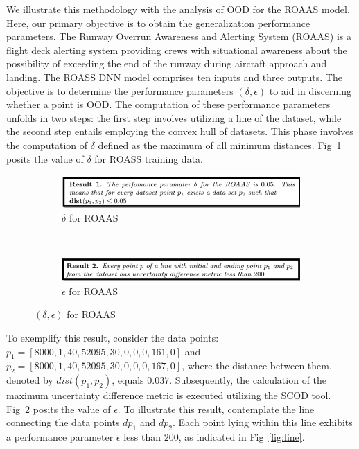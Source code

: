 We illustrate this methodology with the analysis of OOD for the ROAAS model. Here, our primary objective is to obtain the generalization performance parameters. The Runway Overrun Awareness and Alerting System (ROAAS) is a flight deck alerting system providing crews with situational awareness about the possibility of exceeding the end of the runway during aircraft approach and landing. The ROASS DNN model comprises ten inputs and three outputs. The objective is to determine the performance parameters 
$(\delta, \epsilon)$ to aid in discerning whether a point is OOD. The computation of these performance parameters unfolds in two steps: the first step involves utilizing a line of the dataset, while the second step entails employing the convex hull of datasets. This phase involves the computation of $\delta$ defined as the maximum of all minimum distances. Fig~\ref{fig:deltaR} posits the value of $\delta$ for ROASS training data. 
\begin{figure}
\begin{subfigure}{.24\textwidth}
    \includegraphics[width=2.0\linewidth]{Fig/OOD_result1.png}  
    \caption{$\delta$ for ROAAS}
    \label{fig:deltaR}
\end{subfigure}
\\
\begin{subfigure}{.24\textwidth}
    \includegraphics[width=2.0\linewidth]{Fig/OOD_result2.png}  
    \caption{$\epsilon$ for ROAAS}
    \label{fig:epsilonR}
 \end{subfigure}
\caption{$(\delta,\epsilon)$ for ROAAS}
\label{FIGURE LABEL}
\end{figure}
To exemplify this result, consider the data points: $p_1= [8000, 1, 40, 52095, 30, 0,0,0, 161, 0]$ and $p_2= [8000, 1, 40, 52095, 30, 0, 0, 0, 167, 0]$, where the distance between them, denoted by $dist(p_1, p_2)$, equals $0.037$. Subsequently, the calculation of the maximum uncertainty difference metric is executed utilizing the SCOD tool. Fig~\ref{fig:epsilonR} posits the value of $\epsilon$.  To illustrate this result, contemplate the line connecting the data points $dp_1$ and $dp_2$. Each point lying within this line exhibits a performance parameter $\epsilon$ less than $200$, as indicated in Fig~\ref{fig:line}.
